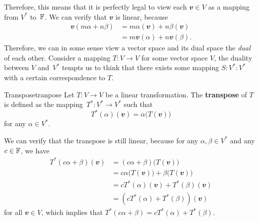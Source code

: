 \documentclass[math]{amznotes}
\theoremstyle{remark}
\begin{document}
Therefore, this means that it is perfectly legal to view each $\mathbfit{v} \in V$ as a mapping from $V^*$ to~$\mathbb{F}$. We can verify that $\mathbfit{v}$ is linear, because
\begin{align*}
    \mathbfit{v}(m\alpha + n\beta) & = m\alpha(\mathbfit{v}) + n\beta(\mathbfit{v}) \\
    & = m\mathbfit{v}(\alpha) + n\mathbfit{v}(\beta).
\end{align*}
Therefore, we can in some sense view a vector space and its dual space the \textit{dual} of each other. Consider a mapping $T \colon V \to V$ for some vector space $V$, the duality between $V$ and~$V^*$ tempts us to think that there exists some mapping $S \colon V^* \colon V^*$ with a certain correspondence to $T$.
\begin{dfnbox}{Transpose}{tranpose}
    Let $T \colon V \to V$ be a linear transformation. The {\color{red} \textbf{transpose}} of $T$ is defined as the mapping~$T^* \colon V^* \to V^*$ such that 
    \begin{equation*}
        T^*(\alpha)(\mathbfit{v}) = \alpha\bigl(T(\mathbfit{v})\bigr)
    \end{equation*}
    for any $\alpha \in V^*$. 
\end{dfnbox}
We can verify that the transpose is still linear, because for any $\alpha, \beta \in V^*$ and any $c \in \mathbb{F}$, we have 
\begin{align*}
    T^*(c\alpha + \beta)(\mathbfit{v}) & = (c\alpha + \beta)\bigl(T(\mathbfit{v})\bigr) \\
    & = c\alpha\bigl(T(\mathbfit{v})\bigr) + \beta\bigl(T(\mathbfit{v})\bigr) \\
    & = cT^*(\alpha)(\mathbfit{v}) + T^*(\beta)(\mathbfit{v}) \\
    & = \left(cT^*(\alpha) + T^*(\beta)\right)(\mathbfit{v})
\end{align*}
for all $\mathbfit{v} \in V$, which implies that $T^*(c\alpha + \beta) = cT^*(\alpha) + T^*(\beta)$.
\end{document}
